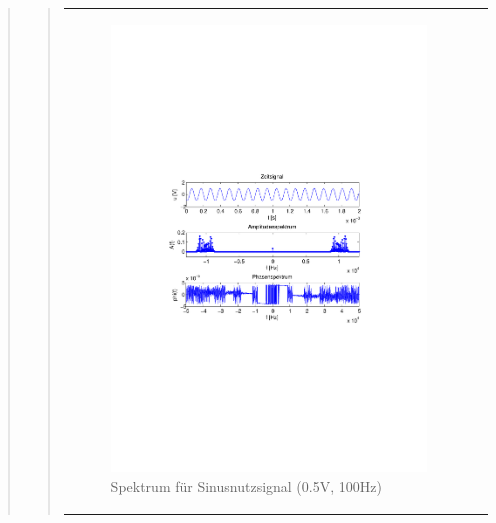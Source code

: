 \begin{quote}
\begin{quote}
\begin{center}
\begin{tabular}{ll}
\begin{minipage}{0.6\textwidth}
                \end{minipage}
                \begin{minipage}{0.6\textwidth}

                     \begin{figure}[H]
                        \label{fig:}
                        \includegraphics[scale=0.5, trim = 4cm 9.5cm 3.5cm
                        9.5cm, clip]{./Bilder/sin_a05_f100}
                        \caption{Spektrum für Sinusnutzsignal (0.5V, 100Hz)}
                    \end{figure}
               \vspace{-1.5em}

                \end{minipage}

            \end{tabular}
            \end{center}
            

\end{quote}
\end{quote}
